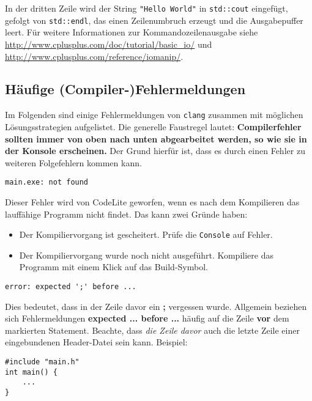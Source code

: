In der dritten Zeile wird der String \lstinline{"Hello World"} in \lstinline{std::cout} eingefügt, gefolgt von \lstinline{std::endl}, das einen Zeilenumbruch erzeugt und die Ausgabepuffer leert. Für weitere Informationen zur Kommandozeilenausgabe siehe \url{http://www.cplusplus.com/doc/tutorial/basic_io/} und \url{http://www.cplusplus.com/reference/iomanip/}.


\subsection*{Häufige (Compiler-)Fehlermeldungen}

Im Folgenden sind einige Fehlermeldungen von \texttt{clang} zusammen mit möglichen Lösungsstrategien aufgelistet.
Die generelle Faustregel lautet: 
\textbf{Compilerfehler sollten immer von oben nach unten abgearbeitet werden, so wie sie in der Konsole erscheinen.}
Der Grund hierfür ist, dass es durch einen Fehler zu weiteren Folgefehlern kommen kann.

\setlength{\leftskip}{1cm}

\begin{verbatim}
main.exe: not found
\end{verbatim}

Dieser Fehler wird von CodeLite geworfen, wenn es nach dem Kompilieren das lauffähige Programm nicht findet.
Das kann zwei Gründe haben:
\begin{itemize}
\item Der Kompiliervorgang ist gescheitert. Prüfe die \texttt{Console} auf Fehler.
\item Der Kompiliervorgang wurde noch nicht ausgeführt. Kompiliere das Programm mit einem Klick auf das Build-Symbol.
\end{itemize}


\begin{verbatim}
error: expected ';' before ...
\end{verbatim}

Dies bedeutet, dass in der Zeile davor ein \textbf{;} vergessen wurde.
Allgemein beziehen sich Fehlermeldungen \textbf{expected ... before ...} häufig auf die Zeile \textbf{vor} dem markierten Statement.
Beachte, dass \emph{die Zeile davor} auch die letzte Zeile einer eingebundenen Header-Datei sein kann. Beispiel:
\begin{lstlisting}[xleftmargin=1cm]
#include "main.h"
int main() {
	...
}
\end{lstlisting}

